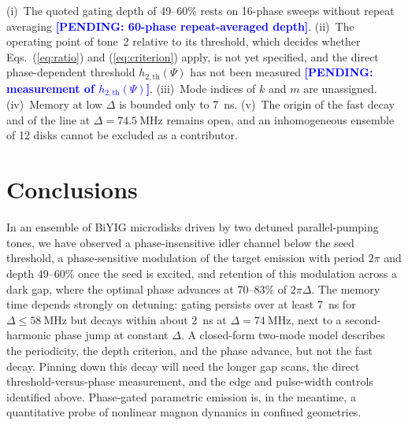 \documentclass[aps,prb,reprint,superscriptaddress,floatfix]{revtex4-2}
\newcommand{\pend}[1]{\textcolor{blue}{\textbf{[PENDING: #1]}}}
\newcommand{\pend}[1]{}
\begin{document}
(i)~The quoted gating depth of 49--60\% rests on 16-phase sweeps without repeat averaging \pend{60-phase repeat-averaged depth}. (ii)~The operating point of tone~2 relative to its threshold, which decides whether Eqs.~(\ref{eq:ratio}) and (\ref{eq:criterion}) apply, is not yet specified, and the direct phase-dependent threshold $h_{2,\mathrm{th}}(\Psi)$ has not been measured \pend{measurement of $h_{2,\mathrm{th}}(\Psi)$}. (iii)~Mode indices of $k$ and $m$ are unassigned. (iv)~Memory at low $\Delta$ is bounded only to \SI{7}{\nano\second}. (v)~The origin of the fast decay and of the line at $\Delta=\SI{74.5}{\mega\hertz}$ remains open, and an inhomogeneous ensemble of 12 disks cannot be excluded as a contributor.

\section{Conclusions}\label{sec:concl}

In an ensemble of BiYIG microdisks driven by two detuned parallel-pumping tones, we have observed a phase-insensitive idler channel below the seed threshold, a phase-sensitive modulation of the target emission with period $2\pi$ and depth 49--60\% once the seed is excited, and retention of this modulation across a dark gap, where the optimal phase advances at 70--83\% of $2\pi\Delta$. The memory time depends strongly on detuning: gating persists over at least \SI{7}{\nano\second} for $\Delta\le\SI{58}{\mega\hertz}$ but decays within about \SI{2}{\nano\second} at $\Delta=\SI{74}{\mega\hertz}$, next to a second-harmonic phase jump at constant $\Delta$. A closed-form two-mode model describes the periodicity, the depth criterion, and the phase advance, but not the fast decay. Pinning down this decay will need the longer gap scans, the direct threshold-versus-phase measurement, and the edge and pulse-width controls identified above. Phase-gated parametric emission is, in the meantime, a quantitative probe of nonlinear magnon dynamics in confined geometries.

\begin{acknowledgments}
\end{acknowledgments}

\appendix
\end{document}
